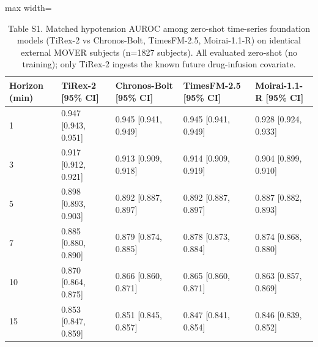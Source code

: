 \documentclass[10pt]{article}
\begin{document}
\begin{table}[H]\centering\footnotesize
\caption{Table S1. Matched hypotension AUROC among zero-shot time-series foundation models (TiRex-2 vs Chronos-Bolt, TimesFM-2.5, Moirai-1.1-R) on identical external MOVER subjects (n=1827 subjects). All evaluated zero-shot (no training); only TiRex-2 ingests the known future drug-infusion covariate.}
\begin{adjustbox}{max width=\textwidth}
\begin{tabular}{lllll}
\toprule
\textbf{Horizon (min)} & \textbf{TiRex-2 [95\% CI]} & \textbf{Chronos-Bolt [95\% CI]} & \textbf{TimesFM-2.5 [95\% CI]} & \textbf{Moirai-1.1-R [95\% CI]} \\
\midrule
1 & 0.947 [0.943, 0.951] & 0.945 [0.941, 0.949] & 0.945 [0.941, 0.949] & 0.928 [0.924, 0.933] \\
3 & 0.917 [0.912, 0.921] & 0.913 [0.909, 0.918] & 0.914 [0.909, 0.919] & 0.904 [0.899, 0.910] \\
5 & 0.898 [0.893, 0.903] & 0.892 [0.887, 0.897] & 0.892 [0.887, 0.897] & 0.887 [0.882, 0.893] \\
7 & 0.885 [0.880, 0.890] & 0.879 [0.874, 0.885] & 0.878 [0.873, 0.884] & 0.874 [0.868, 0.880] \\
10 & 0.870 [0.864, 0.875] & 0.866 [0.860, 0.871] & 0.865 [0.860, 0.871] & 0.863 [0.857, 0.869] \\
15 & 0.853 [0.847, 0.859] & 0.851 [0.845, 0.857] & 0.847 [0.841, 0.854] & 0.846 [0.839, 0.852] \\
\bottomrule
\end{tabular}
\end{adjustbox}
\end{table}
\end{document}
